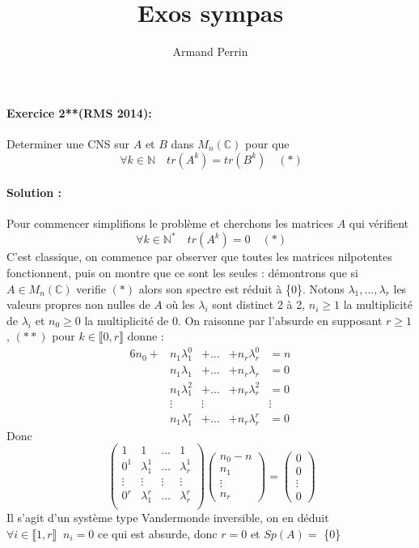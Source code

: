 \documentclass[letterpaper,10pt]{article}
\title{Exos sympas}
\author{Armand Perrin}
\begin{document}
\maketitle%


\paragraph{Exercice 2**(RMS 2014):}

Determiner une CNS sur $A$ et $B$ dans $M_n(\mathbb{C})$ pour que \[\
\forall k \in \mathbb{N} \quad tr(A^k) = tr(B^k) \quad (*) \]
\paragraph{Solution :}
Pour commencer simplifions le problème et cherchons les matrices $A$ qui vérifient \[\
\forall k \in \mathbb{N^*}\quad tr(A^k) = 0
\quad (*) \] C'est classique, on commence par observer que toutes les matrices 
nilpotentes fonctionnent, puis on montre que ce sont les seules : démontrons que si $A \in M_n(\mathbb{C}) $ verifie $(*)$ alors son spectre est réduit à \{0\}. Notons $ \lambda_1,..., \lambda_r$ les valeurs propres non nulles de $A$ où les $\lambda_i$ sont distinct 2 à 2, $n_i \geq 1$ la multiplicité de $\lambda_i$ et $n_0 \geq 0$ la multiplicité de 0. On raisonne par l'absurde en supposant $r \geq 1$,
$(**)$ pour $k\in \llbracket 0, r \rrbracket $ donne : 
\begin{alignat*}{6}
n_0 + &n_1\lambda_1^0 &+\ldots &+n_r\lambda_r^0 & = n\\
&n_1\lambda_1 &+\ldots&+n_r\lambda_r  &= 0\\
&n_1\lambda_1^2 &+\ldots&+n_r\lambda_r^2 &= 0 \\
&\vdots &\vdots  & & \vdots \\
&n_1\lambda_1^{r} &+\ldots&+n_r\lambda_r^{r} &= 0
\end{alignat*}
Donc 
\[\ \begin{pmatrix}
1 & 1 &\ldots & 1 \\
0^1 & \lambda_1^1 & \ldots & \lambda_r^1 \\
\vdots & \vdots & \vdots & \vdots \\
0^r & \lambda_1^r & \ldots & \lambda_r^r \\
\end{pmatrix}\begin{pmatrix}n_0-n \\ n_1\\ \vdots \\ n_r
\end{pmatrix}
=\begin{pmatrix}0 \\ 0\\ \vdots \\ 0
\end{pmatrix}\]
Il s'agit d'un système type Vandermonde  inversible,
on en déduit $\forall i \in\llbracket 1, r\rrbracket \;\; n_i = 0 $ ce qui est absurde, donc $r = 0$ et $Sp(A) =$ \{0\}
\end{document}
